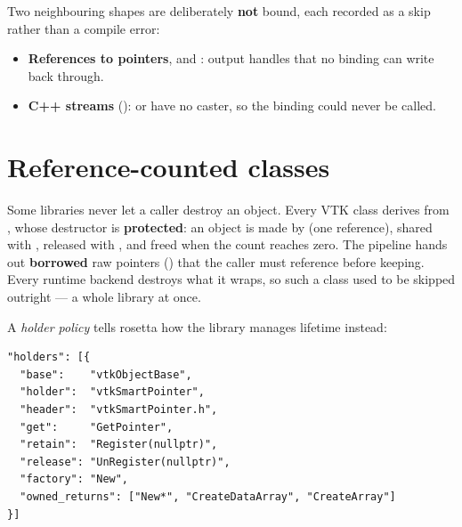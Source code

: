 Two neighbouring shapes are deliberately \textbf{not} bound, each recorded as
a skip rather than a compile error:

\begin{itemize}
  \item \textbf{References to pointers},  and
    : output handles that no binding can write back
    through.
  \item \textbf{C++ streams} ():  or  have no caster, so the binding
    could never be called.
\end{itemize}

\section{Reference-counted classes}
\label{sec:holders}

Some libraries never let a caller destroy an object. Every VTK class derives
from , whose destructor is \textbf{protected}: an object is
made by  (one reference), shared with ,
released with , and freed when the count reaches zero. The
pipeline hands out \textbf{borrowed} raw pointers
() that the caller must reference before
keeping. Every runtime backend destroys what it wraps, so such a class used to be
skipped outright --- a whole library at once.

A \emph{holder policy} tells rosetta how the library manages lifetime instead:

\begin{lstlisting}[style=json]
"holders": [{
  "base":    "vtkObjectBase",
  "holder":  "vtkSmartPointer",
  "header":  "vtkSmartPointer.h",
  "get":     "GetPointer",
  "retain":  "Register(nullptr)",
  "release": "UnRegister(nullptr)",
  "factory": "New",
  "owned_returns": ["New*", "CreateDataArray", "CreateArray"]
}]
\end{lstlisting}

